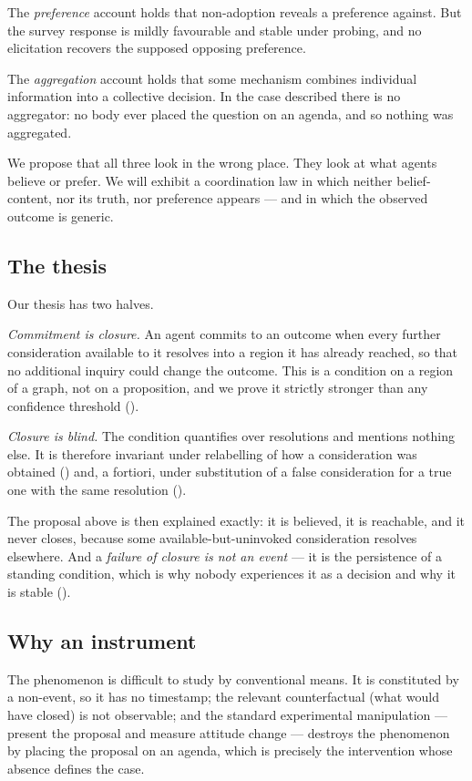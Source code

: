 \documentclass[11pt,a4paper]{article}
\theoremstyle{clstyle}
\theoremstyle{definition}
\theoremstyle{remark}
\begin{document}
The \emph{preference} account holds that non-adoption reveals a preference
against. But the survey response is mildly favourable and stable under
probing, and no elicitation recovers the supposed opposing preference.

The \emph{aggregation} account \citep{hayek1945use} holds that some mechanism
combines individual information into a collective decision. In the case
described there is no aggregator: no body ever placed the question on an
agenda, and so nothing was aggregated.

We propose that all three look in the wrong place. They look at what agents
believe or prefer. We will exhibit a coordination law in which neither
belief-content, nor its truth, nor preference appears --- and in which the
observed outcome is generic.

\subsection{The thesis}

Our thesis has two halves.

\emph{Commitment is closure.} An agent commits to an outcome when every
further consideration available to it resolves into a region it has already
reached, so that no additional inquiry could change the outcome. This is a
condition on a region of a graph, not on a proposition, and we prove it
strictly stronger than any confidence threshold
().

\emph{Closure is blind.} The condition quantifies over resolutions and
mentions nothing else. It is therefore invariant under relabelling of how a
consideration was obtained () and, a fortiori, under
substitution of a false consideration for a true one with the same resolution
().

The proposal above is then explained exactly: it is believed, it is
reachable, and it never closes, because some available-but-uninvoked
consideration resolves elsewhere. And a \emph{failure of closure is not an
event} --- it is the persistence of a standing condition, which is why nobody
experiences it as a decision and why it is stable
().

\subsection{Why an instrument}

The phenomenon is difficult to study by conventional means. It is
constituted by a non-event, so it has no timestamp; the relevant
counterfactual (what would have closed) is not observable; and the standard
experimental manipulation --- present the proposal and measure attitude
change --- destroys the phenomenon by placing the proposal on an agenda,
which is precisely the intervention whose absence defines the case.
\end{document}
